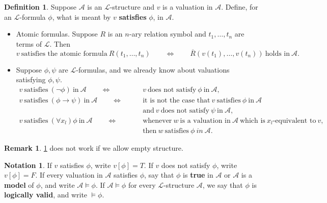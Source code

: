 \documentclass{article}
\newcommand{\A}{\mathcal{A}}
\renewcommand{\L}{\mathcal{L}}
\newcommand{\rb}[1]{\left( #1 \right)}
\renewcommand{\sb}[1]{\left[ #1 \right]}
\newcommand{\notb}[1]{\rb{\neg #1}}
\newcommand{\impb}[2]{\rb{#1 \rightarrow #2}}
\newcommand{\fab}[1]{\rb{\forall #1}}
\theoremstyle{definition}\newtheorem{definition}{Definition}[subsection]
\theoremstyle{definition}\newtheorem{remark1}[definition]{Remark}
\theoremstyle{definition}\newtheorem{example1}[definition]{Example}
\theoremstyle{definition}\newtheorem*{remark2}{Remark}
\theoremstyle{definition}\newtheorem*{example2}{Example}
\theoremstyle{definition}\newtheorem*{note}{Note}
\theoremstyle{definition}\newtheorem*{notation}{Notation}
\begin{document}
\begin{definition}
\label{def:2.2.9}
Suppose $ \A $ is an $ \L $-structure and $ v $ is a valuation in $ \A $. Define, for an $ \L $-formula $ \phi $, what is meant by $ v $ \textbf{satisfies} $ \phi $, in $ \A $.
\begin{itemize}
\item Atomic formulas. Suppose $ R $ is an $ n $-ary relation symbol and $ t_1, \dots, t_n $ are terms of $ \L $. Then
$$ v \ \text{satisfies the atomic formula} \ R\rb{t_1, \dots, t_n} \qquad \iff \qquad \overline{R}\rb{v\rb{t_1}, \dots, v\rb{t_n}} \ \text{holds in} \ \A. $$
\item Suppose $ \phi, \psi $ are $ \L $-formulas, and we already know about valuations satisfying $ \phi, \psi $.
\begin{align*}
v \ \text{satisfies} \ \notb{\phi} \ \text{in} \ \A \qquad \iff \qquad & v \ \text{does not satisfy} \ \phi \ \text{in} \ \A, \\
v \ \text{satisfies} \ \impb{\phi}{\psi} \ \text{in} \ \A \qquad \iff \qquad & \text{it is not the case that} \ v \ \text{satisfies} \ \phi \ \text{in} \ \A \\
& \text{and} \ v \ \text{does not satisfy} \ \psi \ \text{in} \ \A, \\
v \ \text{satisfies} \ \fab{x_l}\phi \ \text{in} \ \A \qquad \iff \qquad & \text{whenever} \ w \ \text{is a valuation in} \ \A \ \text{which is} \ x_l \text{-equivalent to} \ v, \\
& \text{then} \ w \ \text{satisfies} \ \phi \ in \ \A.
\end{align*}
\end{itemize}
\end{definition}


\begin{remark2}
\ref{def:2.2.9} does not work if we allow empty structure.
\end{remark2}

\begin{notation}
If $ v $ satisfies $ \phi $, write $ v\sb{\phi} = T $. If $ v $ does not satisfy $ \phi $, write $ v\sb{\phi} = F $. If every valuation in $ \A $ satisfies $ \phi $, say that $ \phi $ is \textbf{true} in $ \A $ or $ \A $ is a \textbf{model} of $ \phi $, and write $ \A \vDash \phi $. If $ \A \vDash \phi $ for every $ \L $-structure $ \A $, we say that $ \phi $ is \textbf{logically valid}, and write $ \vDash \phi $.
\end{notation}
\end{document}
